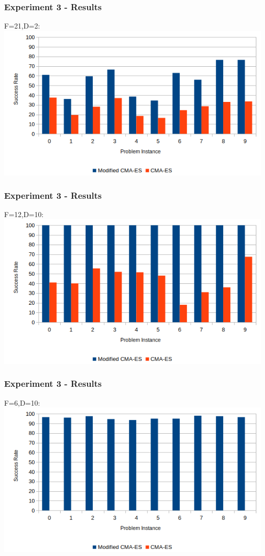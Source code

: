 \documentclass{beamer}
\begin{document}
	\begin{frame}
		\frametitle{Experiment 3 - Results}
		\centering
		F=21,D=2:
		\includegraphics[width=\textwidth]{experiment3_f21d2_bargraph}
	\end{frame} 			
	
	\begin{frame}
		\frametitle{Experiment 3 - Results}
		\centering
		F=12,D=10:
		\includegraphics[width=\textwidth]{experiment3_f12d10_bargraph}
	\end{frame} 
	
	\begin{frame}
		\frametitle{Experiment 3 - Results}
		\centering
		F=6,D=10:
		\includegraphics[width=\textwidth]{experiment3_f6d10_bargraph}
	\end{frame} 
	
\end{document}
